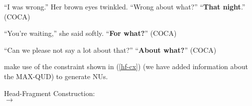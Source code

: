 \documentclass[output=paper
                ,modfonts
                ,nonflat
	        ,collection
	        ,collectionchapter
	        ,collectiontoclongg
 	        ,biblatex
                ,babelshorthands
                ,newtxmath
                ,draftmode
                ,colorlinks, citecolor=brown
]{./langsci/langscibook}
\begin{document}
{\ea ``I was wrong.'' Her brown eyes twinkled. ``Wrong about what?'' ``\textbf{That night}.'' (COCA) \label{34a}\z

\ea ``You're waiting,'' she said softly. ``\textbf{For what?}'' (COCA) \label{35} \z

\ea ``Can we please not say a lot about that?'' ``\textbf{About what?}'' (COCA) \label{36} \z

\citet[304]{Ginzburg:Sag:2000} make use of the constraint shown in (\ref{hf-cx}) (we have added information about the MAX-QUD) to generate NUs.



\ea
\label{hf-cx}
Head-Fragment Construction:\\
$\rightarrow$

}
\end{document}
